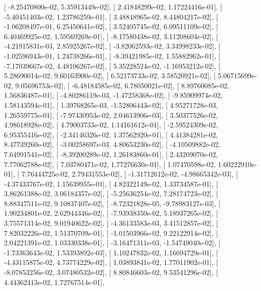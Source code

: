 \documentclass{article}
\begin{document}
       [ -8.25470800e-02,   5.35913449e-02],
       [  2.41848299e-02,   1.17224416e-01],
       [ -5.40451403e-02,   1.23786259e-01],
       [  3.48848965e-02,   8.44804217e-02],
       [ -1.06208497e-01,   6.25450641e-02],
       [  3.52405745e-02,   6.09511109e-02],
       [  6.40469925e-02,   1.59569269e-01],
       [ -8.17580438e-02,   3.11208604e-02],
       [ -4.21915831e-03,   2.85925267e-02],
       [ -3.82062593e-02,   3.34998233e-02],
       [ -1.02596943e-01,   1.24738266e-01],
       [ -8.39421985e-02,   1.55882962e-01],
       [ -7.17039667e-02,   4.48106267e-02],
       [  5.35228524e-02,  -1.16953212e-02],
       [  5.28690014e-02,   9.60163900e-02],
       [  6.52173733e-02,   3.58520921e-02],
       [  5.06715699e-02,   9.05696753e-02],
       [ -6.48184585e-02,   6.78050021e-02],
       [  8.89760085e-02,   1.56836487e-01],
       [ -4.80286119e-03,  -1.47258368e-02],
       [ -9.85909974e-02,   1.58143594e-01],
       [  1.39768265e-03,  -1.52806443e-02],
       [  4.95271728e-03,   1.26559775e-01],
       [ -7.97430953e-02,   2.04613906e-03],
       [  3.50377526e-02,   4.98618928e-02],
       [  4.79003733e-02,   1.14161612e-01],
       [ -2.59524309e-02,   6.95355416e-02],
       [ -2.34146326e-02,   1.37562920e-01],
       [  4.41384281e-02,   8.47739260e-02],
       [ -3.00258697e-03,   4.80653230e-02],
       [ -4.10509882e-02,   7.64991541e-02],
       [ -8.39200289e-02,   1.26183860e-01],
       [  2.43209070e-02,   7.77062788e-02],
       [  7.03780471e-02,   1.77276630e-01],
       [  1.07470598e-02,   1.60222910e-01],
       [  7.76444725e-02,   2.79431553e-02],
       [ -1.31712612e-02,  -4.98665342e-03],
       [ -4.37433767e-02,   1.15639955e-01],
       [  4.82322149e-02,   1.33734587e-01],
       [  3.86261388e-02,   3.06184357e-02],
       [ -5.25636254e-02,   7.28174723e-02],
       [  8.88347511e-02,   9.10837407e-02],
       [ -8.72321828e-05,  -9.78983127e-03],
       [  1.90234801e-02,   2.62944346e-02],
       [ -7.93938350e-02,   5.18937265e-02],
       [  3.75571314e-02,   9.01940622e-02],
       [ -4.36133583e-03,   3.41512857e-02],
       [  7.82032226e-02,   1.51370709e-01],
       [ -1.01503966e-02,   9.22122914e-02],
       [  2.04221391e-02,   1.03330338e-01],
       [ -3.16471311e-03,  -1.54749040e-02],
       [ -1.73363643e-02,   1.53393892e-03],
       [  1.10247832e-02,   1.16694729e-01],
       [ -4.43115875e-02,   4.73774229e-02],
       [  1.03893841e-02,   1.77011902e-01],
       [ -8.07853256e-02,   3.07480532e-02],
       [  8.80846603e-02,   9.53541296e-02],
       [  4.44362413e-02,   1.72767514e-01],
\end{document}
